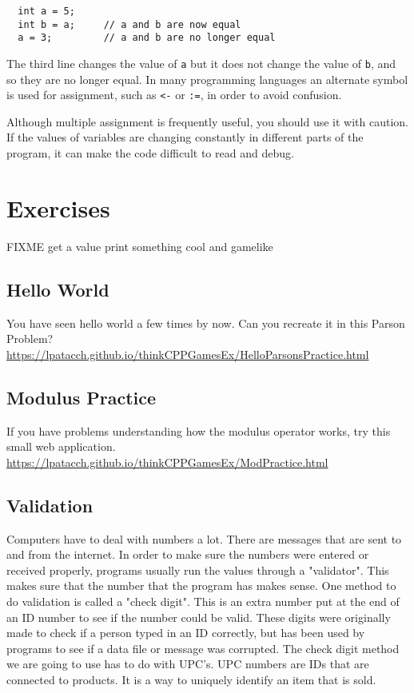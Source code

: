 \begin{verbatim}
  int a = 5;
  int b = a;     // a and b are now equal
  a = 3;         // a and b are no longer equal
\end{verbatim}
%
The third line changes the value of {\tt a} but it does not
change the value of {\tt b}, and so they are no longer equal.
In many programming languages an alternate symbol is used
for assignment, such as {\tt <-} or {\tt :=}, in order to
avoid confusion.

Although multiple assignment is frequently useful, you should
use it with caution.  If the values of variables are changing
constantly in different parts of the program, it can make
the code difficult to read and debug.

\section{Exercises}
FIXME
get a value
print something cool and gamelike
\subsection{Hello World}
You have seen hello world a few times by now. Can you recreate it in this Parson Problem? 
\url{https://lpatacch.github.io/thinkCPPGamesEx/HelloParsonsPractice.html} 
\subsection{Modulus Practice}
If you have problems understanding how the modulus operator works, try this small web application.
\url{https://lpatacch.github.io/thinkCPPGamesEx/ModPractice.html}
\subsection{Validation}
Computers have to deal with numbers a lot. There are messages that are sent to and from the internet. In order to make sure the numbers were entered or received properly, programs usually
run the values through a "validator". This makes sure that the
number that the program has makes sense. One method to 
do validation is called a "check digit". This is an extra number
put at the end of an ID number to see if the number could
be valid. These digits were originally made to check if a 
person typed in an ID correctly, but has been used by programs
to see if a data file or message was corrupted. The check digit
method we are going to use has to do with UPC's. UPC numbers are IDs that are connected to products. It is a way to uniquely identify an item that is sold.

